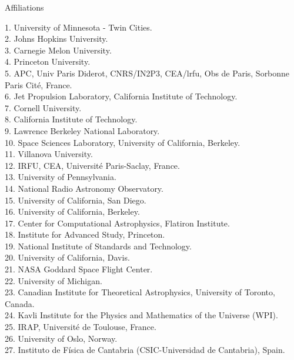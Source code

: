 \documentclass[PICOAPC.tex]{subfiles}
\begin{document}
\Large  {\centerline {Affiliations}}
\vspace{-6pt}
%
\begin{multicols}{2}
\raggedright
\scriptsize {
1. University of Minnesota - Twin Cities.  \\
2. Johns Hopkins University.  \\
3. Carnegie Melon University.  \\
4. Princeton University.  \\
5. APC, Univ Paris Diderot, CNRS/IN2P3, CEA/lrfu, Obs de Paris, Sorbonne Paris Cit\'e, France.  \\
6. Jet Propulsion Laboratory, California Institute of Technology.  \\
7. Cornell University.  \\
8. California Institute of Technology.  \\
9. Lawrence Berkeley National Laboratory.  \\
10. Space Sciences Laboratory, University of California, Berkeley.  \\
11. Villanova University.  \\
12. IRFU, CEA, Universit\'e Paris-Saclay, France.  \\
13. University of Pennsylvania.  \\
14. National Radio Astronomy Observatory.  \\
15. University of California, San Diego.  \\
16. University of California, Berkeley.  \\
17. Center for Computational Astrophysics, Flatiron Institute.  \\
18. Institute for Advanced Study, Princeton.  \\
19. National Institute of Standards and Technology.  \\
20. University of California, Davis.  \\
21. NASA Goddard Space Flight Center.  \\
22. University of Michigan.  \\
23. Canadian Institute for Theoretical Astrophysics, University of Toronto, Canada.  \\
24. Kavli Institute for the Physics and Mathematics of the Universe (WPI).  \\
25. IRAP, Universit\'e de Toulouse, France.  \\
26. University of Oslo, Norway.  \\
27. Instituto de F\'isica de Cantabria (CSIC-Universidad de Cantabria), Spain.  \\
}
\end{multicols}
\end{document}
